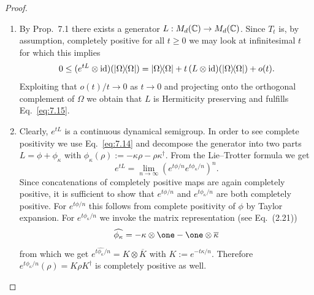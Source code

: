 \documentclass[11pt,a4paper]{article}
\theoremstyle{plain}
\begin{document}
\begin{proof}
    \begin{enumerate}
        \item[1.\ $\Rightarrow$ 2.:] By Prop.~7.1 there exists a generator $L:M_d(\mathbb{C})\to M_d(\mathbb{C})$. Since $T_t$ is, by assumption, completely positive for all $t\ge 0$ we may look at infinitesimal $t$ for which this implies
              \begin{equation}\label{eq:7.16}
                  0 \le (e^{tL}\otimes\mathrm{id})(|\Omega\rangle\!\langle\Omega|)
                  = |\Omega\rangle\!\langle\Omega| + t\,(L\otimes\mathrm{id})(|\Omega\rangle\!\langle\Omega|) + o(t).
              \end{equation}
              Exploiting that $o(t)/t\to 0$ as $t\to 0$ and projecting onto the orthogonal complement of $\Omega$ we obtain that $L$ is Hermiticity preserving and fulfills Eq.~\eqref{eq:7.15}.
        \item[2.\ $\Rightarrow$ 1.:] Clearly, $e^{tL}$ is a continuous dynamical semigroup. In order to see complete positivity we use Eq.~\eqref{eq:7.14} and decompose the generator into two parts $L=\phi+\phi_\kappa$ with $\phi_\kappa(\rho):=-\kappa\rho-\rho\kappa^{\dagger}$. From the Lie--Trotter formula we get
              \begin{equation}\label{eq:7.17}
                  e^{tL} = \lim_{n\to\infty}\left(e^{t\phi/n}e^{t\phi_\kappa/n}\right)^{n}.
              \end{equation}
              Since concatenations of completely positive maps are again completely positive, it is sufficient to show that $e^{t\phi/n}$ and $e^{t\phi_\kappa/n}$ are both completely positive. For $e^{t\phi/n}$ this follows from complete positivity of $\phi$ by Taylor expansion. For $e^{t\phi_\kappa/n}$ we invoke the matrix representation (see Eq.~(2.21))
              \[
                  \widehat{\phi_\kappa} = -\kappa\otimes\one - \one\otimes\overline{\kappa}
              \]
              from which we get $e^{t\widehat{\phi_\kappa}/n} = K\otimes\overline{K}$ with $K:=e^{-t\kappa/n}$. Therefore $e^{t\phi_\kappa/n}(\rho)=K\rho K^{\dagger}$ is completely positive as well.
    \end{enumerate}
\end{proof}
\end{document}
